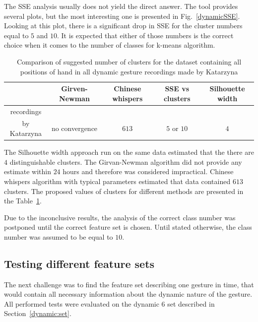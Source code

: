 The SSE analysis usually does not yield the direct answer.
The tool provides several plots, but the most interesting one is presented in Fig.~\ref{dynamicSSE}. 
Looking at this plot, there is a significant drop in SSE for the cluster numbers equal to $5$ and $10$.
It is expected that either of those numbers is the correct choice when it comes to the number of classes for k-means algorithm.

\begin{table}[htbp!]
 \caption{Comparison of suggested number of clusters for the dataset containing all positions of hand in all dynamic gesture recordings made by Katarzyna}
 \label{clusterwyn}
    \begin{tabular}{ccccc}
    \hline
     & Girven-Newman & Chinese whispers   & SSE vs clusters & Silhouette width  \\ \hline
    recordings \\by Katarzyna          & no convergence      & $613$ & $5$ or $10$     & $4$     \\ \hline
    \end{tabular}
\end{table}

The Silhouette width approach run on the same data estimated that the there are $4$ distinguishable clusters.
The Girvan-Newman algorithm did not provide any estimate within $24$ hours and therefore was considered impractical.
Chinese whispers algorithm with typical parameters estimated that data contained $613$ clusters.
The proposed values of clusters for different methods are presented in the Table~\ref{clusterwyn}.

Due to the inconclusive results, the analysis of the correct class number was postponed until the correct feature set is chosen.
Until stated otherwise, the class number was assumed to be equal to $10$.

\subsection{Testing different feature sets}
The next challenge was to find the feature set describing one gesture in time, that would contain all necessary information about the dynamic nature of the gesture. 
All performed tests were evaluated on the dynamic 6 set described in Section~\ref{dynamic:set}.

